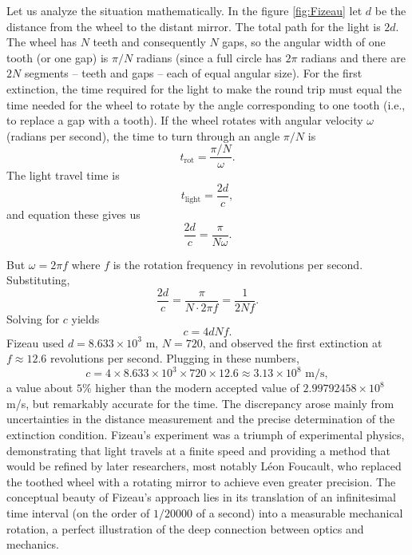         Let us analyze the situation mathematically. In the figure \ref{fig:Fizeau} let $d$ be the distance from the wheel to the distant mirror. The total path for the light is $2d$. The wheel has $N$ teeth and consequently $N$ gaps, so the angular width of one tooth (or one gap) is $\pi/N$ radians (since a full circle has $2\pi$ radians and there are $2N$ segments – teeth and gaps – each of equal angular size). For the first extinction, the time required for the light to make the round trip must equal the time needed for the wheel to rotate by the angle corresponding to one tooth (i.e., to replace a gap with a tooth). If the wheel rotates with angular velocity $\omega$ (radians per second), the time to turn through an angle $\pi/N$ is 
        \begin{equation}
        t_{\text{rot}} = \frac{\pi/N}{\omega}.
        \end{equation}
        The light travel time is 
        \begin{equation}
        t_{\text{light}} = \frac{2d}{c},
        \end{equation}
        and equation these gives  us
        \begin{equation}
        \frac{2d}{c} = \frac{\pi}{N \omega}.
        \end{equation}
        
        But $\omega = 2\pi f$ where $f$ is the rotation frequency in revolutions per second. Substituting,
        \begin{equation}
        \frac{2d}{c} = \frac{\pi}{N \cdot 2\pi f} = \frac{1}{2N f}.
        \end{equation}
        Solving for $c$ yields
        \begin{equation}
        c = 4 d N f.
        \end{equation}
        Fizeau used $d = 8.633 \times 10^3$ m, $N = 720$, and observed the first extinction at $f \approx 12.6$ revolutions per second. Plugging in these numbers,
        \begin{equation}
        c = 4 \times 8.633 \times 10^3 \times 720 \times 12.6 \approx 3.13 \times 10^8 \text{ m/s},
        \end{equation}
        a value about $5\%$ higher than the modern accepted value of $2.99792458 \times 10^8$ m/s, but remarkably accurate for the time. The discrepancy arose mainly from uncertainties in the distance measurement and the precise determination of the extinction condition. Fizeau's experiment was a triumph of experimental physics, demonstrating that light travels at a finite speed and providing a method that would be refined by later researchers, most notably Léon Foucault, who replaced the toothed wheel with a rotating mirror to achieve even greater precision. The conceptual beauty of Fizeau's approach lies in its translation of an infinitesimal time interval (on the order of $1/20000$ of a second) into a measurable mechanical rotation, a perfect illustration of the deep connection between optics and mechanics.\\

